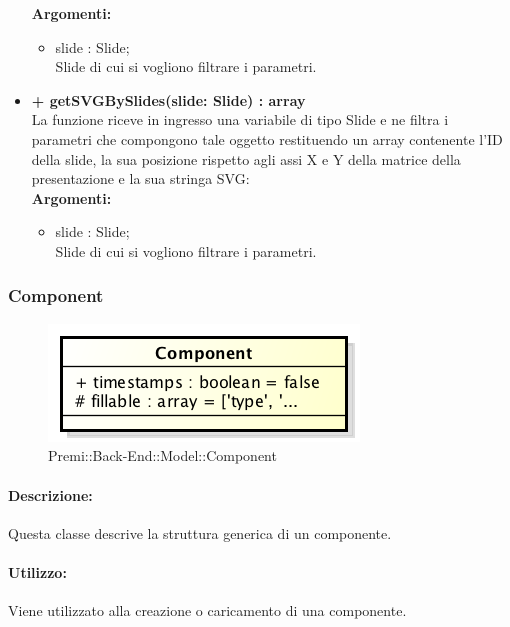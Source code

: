 \begin{itemize}
		\textbf{Argomenti:}
		\begin{itemize}
			\item slide : Slide;\\
			\gls{Slide} di cui si vogliono filtrare i parametri.
		\end{itemize}
		\item \textbf{+ getSVGBySlides(slide: Slide) : array}\\
		La funzione riceve in ingresso una variabile di tipo Slide e ne filtra i parametri che compongono tale oggetto restituendo un array contenente l'ID della \gls{slide}, la sua posizione rispetto agli assi X e Y della matrice della presentazione e la sua stringa SVG:\\
		\textbf{Argomenti:}
		\begin{itemize}
			\item slide : Slide;\\
			\gls{Slide} di cui si vogliono filtrare i parametri.
		\end{itemize}
	\end{itemize}
	\newpage
	

\subsubsection{Component}

	\begin{figure}[h]
		\centering
		\includegraphics[width=0.5\linewidth]{img/back_end_premi_model_component}
		\caption[Premi::Back-End::Model::Component]{Premi::Back-End::Model::Component}
		\label{fig:back_end_premi_model_component}
	\end{figure}


	\paragraph{Descrizione:}
	Questa classe descrive la struttura generica di un componente.
	
	\paragraph{Utilizzo:}
	Viene utilizzato alla creazione o caricamento di una componente.
	
